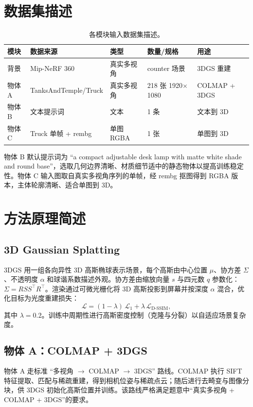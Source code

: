 \documentclass{article}
\begin{document}
\section{数据集描述}

\begin{table}[H]
  \centering
  \caption{各模块输入数据集描述。}
  \label{tab:dataset}
  \begin{tabular}{lllll}
    \toprule
    模块 & 数据来源 & 类型 & 数量/规格 & 用途 \\
    \midrule
    背景 & Mip-NeRF 360~\cite{mipnerf3602022} & 真实多视角 & counter 场景 & 3DGS 重建 \\
    物体 A & TanksAndTemple/Truck & 真实多视角 & 218 张 1920$\times$1080 & COLMAP + 3DGS \\
    物体 B & 文本提示词 & 文本 & 1 条 & 文本到 3D \\
    物体 C & Truck 单帧 + rembg & 单图 RGBA & 1 张 & 单图到 3D \\
    \bottomrule
  \end{tabular}
\end{table}

物体 B 默认提示词为 ``a compact adjustable desk lamp with matte white shade and round base''，选取几何边界清晰、材质细节适中的静态物体以提高训练稳定性。物体 C 输入图取自真实多视角序列的单帧，经 rembg 抠图得到 RGBA 版本，主体轮廓清晰、适合单图到 3D。

\section{方法原理简述}

\subsection{3D Gaussian Splatting}
3DGS 用一组各向异性 3D 高斯椭球表示场景，每个高斯由中心位置 $\mu$、协方差 $\Sigma$、不透明度 $\alpha$ 和球谐系数描述外观。协方差由缩放向量 $s$ 与四元数 $q$ 参数化：$\Sigma = R S S^\top R^\top$。渲染通过可微光栅化将 3D 高斯投影到屏幕并按深度 $\alpha$ 混合，优化目标为光度重建损失：
\begin{equation}
  \mathcal{L} = (1-\lambda)\,\mathcal{L}_1 + \lambda\,\mathcal{L}_{\text{D-SSIM}},
\end{equation}
其中 $\lambda=0.2$。训练中周期性进行高斯密度控制（克隆与分裂）以自适应场景复杂度。

\subsection{物体 A：COLMAP + 3DGS}
物体 A 走标准 ``多视角 $\rightarrow$ COLMAP $\rightarrow$ 3DGS'' 路线。COLMAP 执行 SIFT 特征提取、匹配与稀疏重建，得到相机位姿与稀疏点云；随后进行去畸变与图像分块，供 3DGS 初始化高斯位置并训练。该路线严格满足题意中``真实多视角 + COLMAP + 3DGS''的要求。
\end{document}
